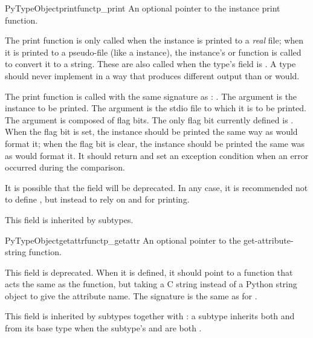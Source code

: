 \begin{cmemberdesc}{PyTypeObject}{printfunc}{tp_print}
  An optional pointer to the instance print function.

  The print function is only called when the instance is printed to a
  \emph{real} file; when it is printed to a pseudo-file (like a
   instance), the instance's  or
   function is called to convert it to a string.  These
  are also called when the type's  field is \NULL.  A
  type should never implement  in a way that produces
  different output than  or  would.

  The print function is called with the same signature as
  : .  The  argument is the instance to be
  printed.  The  argument is the stdio file to which it is
  to be printed.  The  argument is composed of flag bits.
  The only flag bit currently defined is .
  When the  flag bit is set, the instance
  should be printed the same way as  would format it;
  when the  flag bit is clear, the instance
  should be printed the same was as  would format it.
  It should return  and set an exception condition when an
  error occurred during the comparison.

  It is possible that the  field will be deprecated.
  In any case, it is recommended not to define , but
  instead to rely on  and  for
  printing.

  This field is inherited by subtypes.
\end{cmemberdesc}

\begin{cmemberdesc}{PyTypeObject}{getattrfunc}{tp_getattr}
  An optional pointer to the get-attribute-string function.

  This field is deprecated.  When it is defined, it should point to a
  function that acts the same as the  function,
  but taking a C string instead of a Python string object to give the
  attribute name.  The signature is the same as for
  .

  This field is inherited by subtypes together with
  : a subtype inherits both 
  and  from its base type when the subtype's
   and  are both \NULL.
\end{cmemberdesc}

